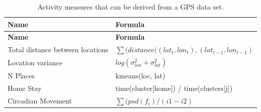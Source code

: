 \documentclass[]{book}
\begin{document}
\begin{longtable}[]{@{}ll@{}}
\caption{\label{tab:GPSfeatures} Activity measures that can be derived from
a GPS data set.}\tabularnewline
\toprule
\begin{minipage}[b]{0.34\columnwidth}\raggedright\strut
\textbf{Name}\strut
\end{minipage} & \begin{minipage}[b]{0.60\columnwidth}\raggedright\strut
\textbf{Formula}\strut
\end{minipage}\tabularnewline
\midrule
\endfirsthead
\toprule
\begin{minipage}[b]{0.34\columnwidth}\raggedright\strut
\textbf{Name}\strut
\end{minipage} & \begin{minipage}[b]{0.60\columnwidth}\raggedright\strut
\textbf{Formula}\strut
\end{minipage}\tabularnewline
\midrule
\endhead
\begin{minipage}[t]{0.34\columnwidth}\raggedright\strut
Total distance between locations\strut
\end{minipage} & \begin{minipage}[t]{0.60\columnwidth}\raggedright\strut
\(\sum(distance((lat_{t}, lon_{t}), (lat_{t-1}, lon_{t-1})\)\strut
\end{minipage}\tabularnewline
\begin{minipage}[t]{0.34\columnwidth}\raggedright\strut
Location variance\strut
\end{minipage} & \begin{minipage}[t]{0.60\columnwidth}\raggedright\strut
\(log(\sigma_{lon}^2 + \sigma_{lat}^2)\)\strut
\end{minipage}\tabularnewline
\begin{minipage}[t]{0.34\columnwidth}\raggedright\strut
N Places\strut
\end{minipage} & \begin{minipage}[t]{0.60\columnwidth}\raggedright\strut
kmeans(loc, lat)\strut
\end{minipage}\tabularnewline
\begin{minipage}[t]{0.34\columnwidth}\raggedright\strut
Home Stay\strut
\end{minipage} & \begin{minipage}[t]{0.60\columnwidth}\raggedright\strut
time(cluster{[}home{]}) / time(clusters{[}j{]})\strut
\end{minipage}\tabularnewline
\begin{minipage}[t]{0.34\columnwidth}\raggedright\strut
Circadian Movement\strut
\end{minipage} & \begin{minipage}[t]{0.60\columnwidth}\raggedright\strut
\(\sum(psd(f_i) / (i1 - i2)\)\strut
\end{minipage}\tabularnewline
\bottomrule
\end{longtable}
\end{document}

